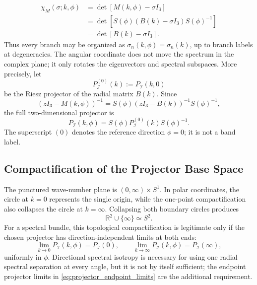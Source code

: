 \documentclass[11pt]{article}
\numberwithin{equation}{section}
\begin{document}
\begin{align}
  \chi_M(\sigma;k,\phi)
  &=
  \det[M(k,\phi)-\sigma I_3]\nonumber\\
  &=
  \det[S(\phi)(B(k)-\sigma I_3)S(\phi)^{-1}]\nonumber\\
  &=
  \det[B(k)-\sigma I_3].
  \label{eq:direction_independent_characteristic}
\end{align}
Thus every branch may be organized as $\sigma_n(k,\phi)=\sigma_n(k)$,
up to branch labels at degeneracies. The angular coordinate does not
move the spectrum in the complex plane; it only rotates the eigenvectors
and spectral subspaces. More precisely, let
\begin{equation}
  P_{\mathcal I}^{(0)}(k):=P_{\mathcal I}(k,0)
\end{equation}
be the Riesz projector of the radial matrix $B(k)$. Since
\begin{equation}
  (zI_3-M(k,\phi))^{-1}
  =S(\phi)(zI_3-B(k))^{-1}S(\phi)^{-1},
\end{equation}
the full two-dimensional projector is
\begin{equation}
  P_{\mathcal I}(k,\phi)=
  S(\phi)P_{\mathcal I}^{(0)}(k)S(\phi)^{-1}.
  \label{eq:projector_rotational_covariance}
\end{equation}
The superscript $(0)$ denotes the reference direction $\phi=0$; it is not
a band label.

\subsection{Compactification of the Projector Base Space}

The punctured wave-number plane is $(0,\infty)\times S^1$. In polar
coordinates, the circle at $k=0$ represents the single origin, while the
one-point compactification also collapses the circle at $k=\infty$.
Collapsing both boundary circles produces
\begin{equation}
  \mathbb R^2\cup\{\infty\}\simeq S^2.
  \label{eq:wavenumber_compactification}
\end{equation}
For a spectral bundle, this topological compactification is legitimate
only if the chosen projector has direction-independent limits at both
ends:
\begin{equation}
  \lim_{k\to0}P_{\mathcal I}(k,\phi)=P_{\mathcal I}(0),
  \qquad
  \lim_{k\to\infty}P_{\mathcal I}(k,\phi)=P_{\mathcal I}(\infty),
  \label{eq:projector_endpoint_limits}
\end{equation}
uniformly in $\phi$. Directional spectral isotropy is necessary for using
one radial spectral separation at every angle, but it is not by itself
sufficient; the endpoint projector limits in
\eqref{eq:projector_endpoint_limits} are the additional requirement.
\end{document}
